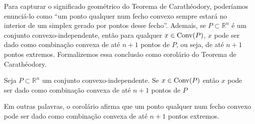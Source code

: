 Para capturar o significado geométrico do Teorema de Carathéodory, poderíamos
enunciá-lo como ``um ponto qualquer num fecho convexo sempre estará no interior
de um simplex gerado por pontos desse fecho''. Ademais, se $P \subset \mathbb{R}^n$ é um conjunto
convexo-independente, então para qualquer $x \in \mathrm{Conv}(P)$, $x$ pode ser dado
como combinação convexa de até $n + 1$ pontos de $P$, ou seja, de até $n + 1$ pontos extremos. 
Formalizemos essa conclusão como corolário do Teorema de Carathéodory.

\begin{cor:caratheodory}
	Seja $P \subset \mathbb{R}^n$ um conjunto convexo-independente. Se $x \in \mathrm{Conv}(P)$
	então $x$ pode ser dado como combinação convexa de até $n + 1$ pontos de $P$	
\end{cor:caratheodory}

Em outras palavras, o corolário afirma que um ponto qualquer num fecho convexo
pode ser dado como combinação convexa de até $n+1$ pontos extremos.
